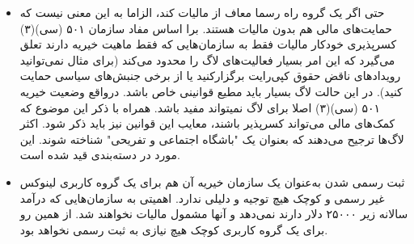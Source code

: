 \begin{itemize}
\item
حتی اگر  یک گروه راه رسما معاف از مالیات کند، الزاما به این معنی نیست
که حمایت‌های مالی هم بدون مالیات هستند. برا اساس مفاد سازمان ۵۰۱ (سی)(۳) کسرپذیری
خودکار مالیات فقط به سازمان‌هایی که فقط ماهیت خیریه دارند تعلق می‌گیرد که این امر
بسیار فعالیت‌های لاگ را محدود می‌کند (برای مثال نمی‌توانید رویدادهای ناقض حقوق کپی‌رایت
برگزارکنید یا از برخی جنبش‌های سیاسی حمایت کنید). در این حالت لاگ بسیار باید مطیع قوانینی
خاص باشد. درواقع وضعیت خیریه ۵۰۱ (سی)(۳) اصلا برای لاگ نمیتواند مفید باشد.
همراه با ذکر این موضوع که کمک‌های مالی می‌تواند کسرپذیر باشند، معایب این قوانین نیز
باید ذکر شود. اکثر لاگ‌ها ترجیح می‌دهند که بعنوان یک "باشگاه اجتماعی و تفریحی" شناخته شوند.
این مورد در دسته‌بندی
قید شده است.

\item
ثبت رسمی شدن به‌عنوان یک سازمان خیریه آن هم برای یک گروه کاربری لینوکس غیر رسمی و کوچک
هیچ توجیه و دلیلی ندارد.  اهمیتی به سازمان‌هایی که درآمد سالانه زیر ۲۵۰۰۰ دلار دارند نمی‌دهد
و آنها مشمول مالیات نخواهند شد. از همین رو برای یک گروه کاربری کوچک هیچ نیازی به ثبت رسمی نخواهد بود.


\end{itemize}
